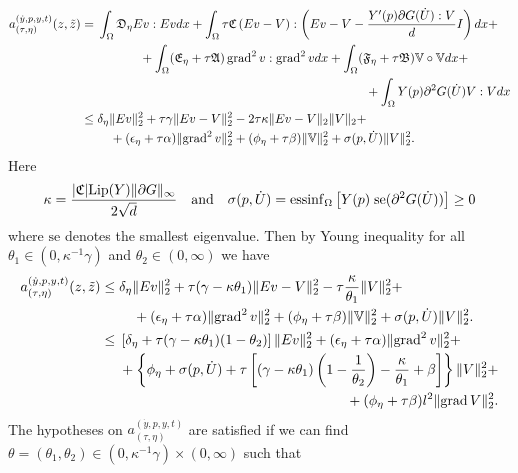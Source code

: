 \[
\begin{split}
a_{(\tau,\eta)}^{(\dot y,p,y,t)}(z,\tilde z)&=
\begin{multlined}[t]
\int_\Omega\mathfrak{D}_\eta Ev:Evdx+\int_\Omega\tau\mathfrak{C}\left(Ev-V\right):\left(Ev-V-\frac{Y'(p)\partial G(\dot U):V}{d}I\right)dx+\\
+\int_\Omega(\mathfrak{E}_\eta+\tau\mathfrak{A})\grad^2v:\grad^2vdx+\int_\Omega(\mathfrak{F}_\eta+\tau\mathfrak{B})\mathbb{V}\circ\mathbb{V}dx+\\
+\int_\Omega Y(p)\partial^2 G(\dot U)V:Vdx
\end{multlined}
\\
&\le
\begin{multlined}[t]
\delta_\eta\norm{Ev}_2^2+\tau\gamma\norm{Ev-V}_2^2-2\tau\kappa\norm{Ev-V}_2\norm{V}_2+\\
+(\epsilon_\eta+\tau\alpha)\norm{\grad^2v}_2^2+(\phi_\eta+\tau\beta)\norm{\mathbb{V}}_2^2+\sigma(p,\dot U)\norm{V}_2^2.
\end{multlined}
\end{split}
\]
Here
\[
\kappa=\frac{|\mathfrak C|\text{Lip}(Y)\lVert\partial G\rVert_\infty}{2\sqrt{d}}\quad\text{and}\quad\sigma(p,\dot U)=\operatorname{essinf}_\Omega\left[Y(p)\;\text{se}(\partial^2G(\dot U))\right]\ge0
\]
where $\text{se}$ denotes the smallest eigenvalue. Then by Young inequality for all $\theta_1\in(0,\kappa^{-1}\gamma)$ and $\theta_2\in(0,\infty)$ we have
\[
\begin{split}
a_{(\tau,\eta)}^{(\dot y,p,y,t)}(z,\tilde z)&\le
\begin{multlined}[t]
\delta_\eta\norm{Ev}_2^2+\tau(\gamma-\kappa\theta_1)\norm{Ev-V}_2^2-\tau\frac{\kappa}{\theta_1}\norm{V}_2^2+\\
+(\epsilon_\eta+\tau\alpha)\norm{\grad^2v}_2^2+(\phi_\eta+\tau\beta)\norm{\mathbb{V}}_2^2+\sigma(p,\dot U)\norm{V}_2^2.
\end{multlined}
\\
&\le
\begin{multlined}[t]
\left[\delta_\eta+\tau(\gamma-\kappa\theta_1)(1-\theta_2)\right]\norm{Ev}_2^2+(\epsilon_\eta+\tau\alpha)\norm{\grad^2v}_2^2+\\
+\left\{\phi_\eta+\sigma(p,\dot U)+\tau\left[(\gamma-\kappa\theta_1)\left(1-\frac{1}{\theta_2}\right)-\frac{\kappa}{\theta_1}+\beta\right]\right\}\norm{V}_2^2+\\
+(\phi_\eta+\tau\beta)l^2\norm{\grad{V}}_2^2.
\end{multlined}
\end{split}
\]
The hypotheses on $a_{(\tau,\eta)}^{(\dot y,p,y,t)}$ are satisfied if we can find $\theta=(\theta_1,\theta_2)\in(0,\kappa^{-1}\gamma)\times(0,\infty)$ such that
